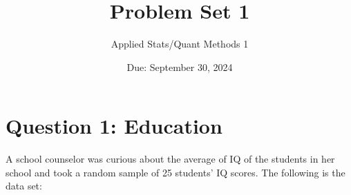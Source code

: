 \documentclass[12pt,letterpaper]{article}
\title{Problem Set 1}
\date{Due: September 30, 2024}
\author{Applied Stats/Quant Methods 1}
\begin{document}
	\maketitle
	
	
	\vspace{.2cm}
	\section*{Question 1: Education}
	\vspace{.2cm}
A school counselor was curious about the average of IQ of the students in her school and took a random sample of 25 students' IQ scores. The following is the data set:\\


  

\vspace{.1cm}
\end{document}

